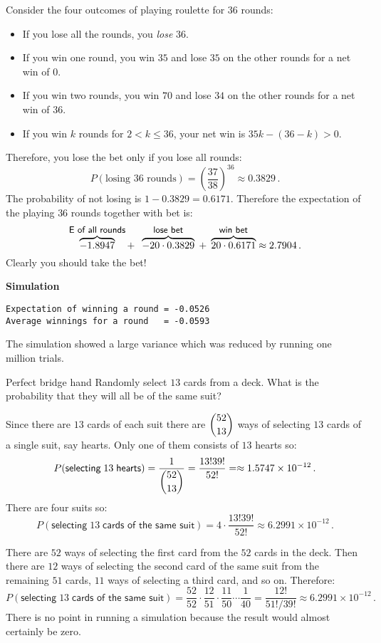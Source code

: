 Consider the four outcomes of playing roulette for $36$ rounds:
\begin{itemize}
\item If you lose all the rounds, you \emph{lose} $36$.
\item If you win one round, you win $35$ and lose $35$ on the other rounds for a net win of $0$.
\item If you win two rounds, you win $70$ and lose $34$ on the other rounds for a net win of $36$.
\item If you win $k$ rounds for $2<k\leq 36$, your net win is $35k - (36-k)>0$.
\end{itemize}
Therefore, you lose the bet only if you lose all rounds:
\[
P(\textrm{losing\ } 36 \textrm{\ rounds})=\left(\frac{37}{38}\right)^{36}\approx 0.3829\,.
\]
The probability of not losing is $1-0.3829=0.6171$. Therefore the expectation of the playing $36$ rounds together with bet is:
\[
\overbrace{-1.8947}^{\textsf{\small E of all rounds}}+\;\;
\overbrace{-20\cdot 0.3829}^{\textsf{\small lose bet}} \;+\; \overbrace{20\cdot 0.6171}^{\textsf{\small win bet}} \approx 2.7904\,.
\]
Clearly you should take the bet!

\textbf{Simulation}
\begin{verbatim}
Expectation of winning a round = -0.0526
Average winnings for a round   = -0.0593
\end{verbatim}
The simulation showed a large variance which was reduced by running one million trials.


\begin{prob}{Perfect bridge hand}
Randomly select $13$ cards from a deck. What is the probability that they will all be of the same suit?
\end{prob}


Since there are $13$ cards of each suit there are $\displaystyle{52 \choose 13}$ ways of selecting $13$ cards of a single suit, say hearts. Only one of them consists of $13$ hearts so:
\[
P(\textsf{selecting}\;13\;\textsf{hearts})=\frac{1}{\displaystyle{52 \choose 13}}=\frac{13! 39!}{52!}=\approx 1.5747\times 10^{-12}\,.
\]
There are four suits so:
\[
P(\textsf{selecting}\;13\;\textsf{cards of the same suit})=4\cdot \frac{13! 39!}{52!}\approx 6.2991\times 10^{-12}\,.
\]


There are $52$ ways of selecting the first card from the $52$ cards in the deck. Then there are $12$ ways of selecting the second card of the same suit from the remaining $51$ cards, $11$ ways of selecting a third card, and so on. Therefore:
\[
P(\textsf{selecting}\;13\;\textsf{cards of the same suit})=\frac{52}{52}\cdot \frac{12}{51}\cdot \frac{11}{50} \cdots  \frac{1}{40}= \frac{12!}{51!/39!}\approx 6.2991\times 10^{-12}\,.
\]
There is no point in running a simulation because the result would almost certainly be zero.

